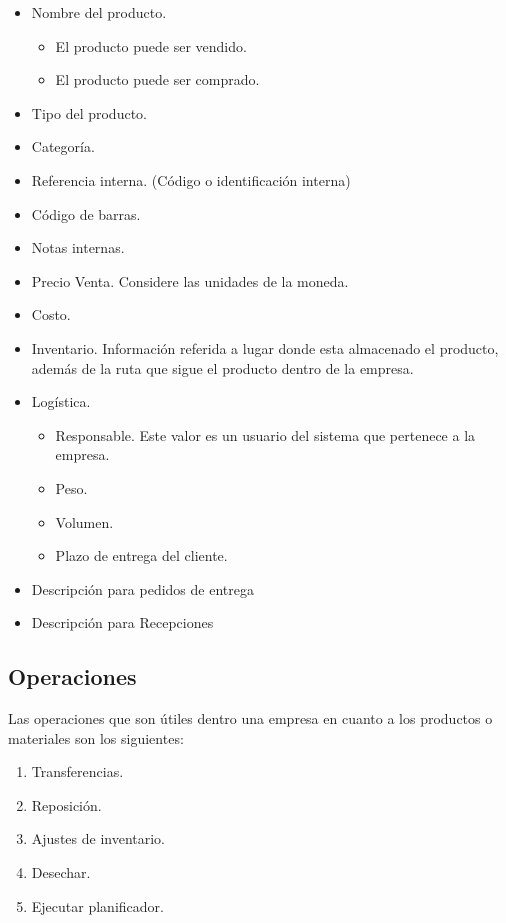 \begin{itemize}
\item Nombre del producto.
\begin{itemize}
\item El producto puede ser vendido.
\item El producto puede ser comprado.
\end{itemize}
\item Tipo del producto.
\item Categoría.
\item Referencia interna. (Código o identificación interna)
\item Código de barras.
\item Notas internas.
\item Precio Venta. Considere las unidades de la moneda.
\item Costo.
\item Inventario. Información referida a lugar donde esta almacenado el producto, además de la ruta que sigue el producto dentro de la empresa.
\item Logística.
\begin{itemize}
\item Responsable. Este valor es un usuario del sistema que pertenece a la empresa.
\item Peso.
\item Volumen.
\item Plazo de entrega del cliente.
\end{itemize}
\item Descripción para pedidos de entrega
\item Descripción para Recepciones
\end{itemize}

\subsection{Operaciones}

Las operaciones que son útiles dentro una empresa en cuanto a los productos o materiales son los siguientes:

\begin{enumerate}
\item Transferencias.
\item Reposición.
\item Ajustes de inventario.
\item Desechar.
\item Ejecutar planificador.
\end{enumerate}

